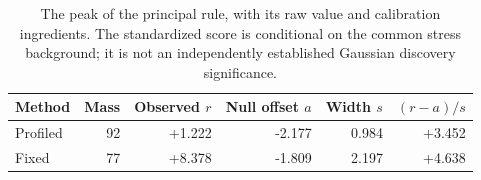 \begin{table}[H]\centering\small
\begin{tabular}{lrrrrr}\toprule
Method & Mass & Observed $r$ & Null offset $a$ & Width $s$ & $(r-a)/s$\\\midrule
Profiled & 92 & +1.222 & -2.177 & 0.984 & +3.452 \\
Fixed & 77 & +8.378 & -1.809 & 2.197 & +4.638 \\
\bottomrule\end{tabular}
\caption{The peak of the principal rule, with its raw value and calibration ingredients. The standardized score is conditional on the common stress background; it is not an independently established Gaussian discovery significance.}\end{table}

